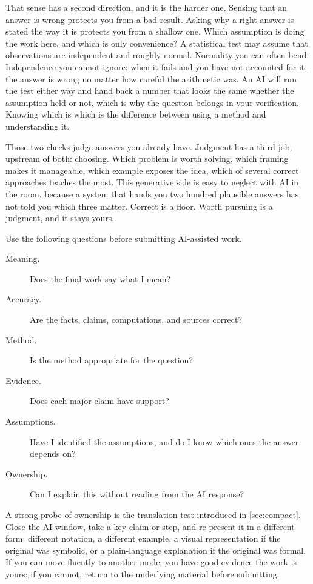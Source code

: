 \documentclass{SIAMbook2023}
\begin{document}
That sense has a second direction, and it is the harder one. Sensing that an answer is wrong protects you from a bad result. Asking why a right answer is stated the way it is protects you from a shallow one. Which assumption is doing the work here, and which is only convenience? A statistical test may assume that observations are independent and roughly normal. Normality you can often bend. Independence you cannot ignore: when it fails and you have not accounted for it, the answer is wrong no matter how careful the arithmetic was. An AI will run the test either way and hand back a number that looks the same whether the assumption held or not, which is why the question belongs in your verification. Knowing which is which is the difference between using a method and understanding it.

Those two checks judge answers you already have. Judgment has a third job, upstream of both: choosing. Which problem is worth solving, which framing makes it manageable, which example exposes the idea, which of several correct approaches teaches the most. This generative side is easy to neglect with AI in the room, because a system that hands you two hundred plausible answers has not told you which three matter. Correct is a floor. Worth pursuing is a judgment, and it stays yours.

Use the following questions before submitting AI-assisted work.

\begin{description}
\item[Meaning.] Does the final work say what I mean?
\item[Accuracy.] Are the facts, claims, computations, and sources correct?
\item[Method.] Is the method appropriate for the question?
\item[Evidence.] Does each major claim have support?
\item[Assumptions.] Have I identified the assumptions, and do I know which ones the answer depends on?
\item[Ownership.] Can I explain this without reading from the AI response?
\end{description}

A strong probe of ownership is the translation test introduced in \cref{sec:compact}. Close the AI window, take a key claim or step, and re-present it in a different form: different notation, a different example, a visual representation if the original was symbolic, or a plain-language explanation if the original was formal. If you can move fluently to another mode, you have good evidence the work is yours; if you cannot, return to the underlying material before submitting.
\end{document}
